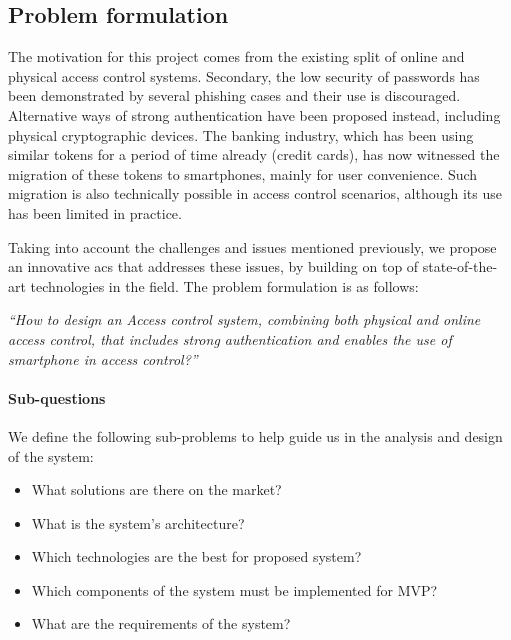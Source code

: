 \subsection{Problem formulation} \label{problemFormulation}
The motivation for this project comes from the existing split of online and physical access control systems. Secondary, the low security of passwords has been demonstrated by several phishing cases and their use is discouraged. Alternative ways of strong authentication have been proposed instead, including physical cryptographic devices. The banking industry, which has been using similar tokens for a period of time already (credit cards), has now witnessed the migration of these tokens to smartphones, mainly for user convenience. Such migration is also technically possible in access control scenarios, although its use has been limited in practice.

Taking into account the challenges and issues mentioned previously, we propose an innovative \acrshort{acs} that addresses these issues, by building on top of state-of-the-art technologies in the field. The problem formulation is as follows:

\begin{center}
    \textit{“How to design an Access control system, combining both physical and online access control, that includes strong authentication and enables the use of smartphone in access control?”}
\end{center}

\paragraph{Sub-questions}
We define the following sub-problems to help guide us in the analysis and design of the system:

\begin{itemize}[noitemsep]
    \item What solutions are there on the market?
    \item What is the system’s architecture?
    \item Which technologies are the best for proposed system?
    \item Which components of the system must be implemented for MVP?
    \item What are the requirements of the system?
\end{itemize}